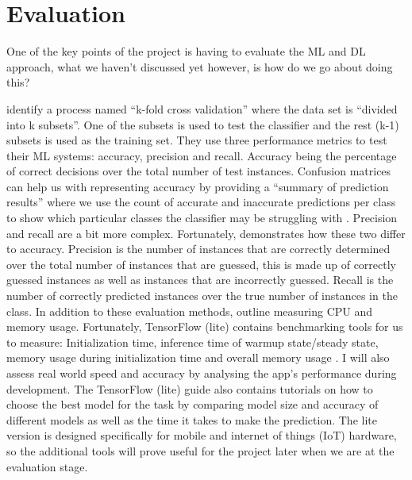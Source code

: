 \documentclass[12pt,a4paper]{report}
\begin{document}
\section{Evaluation}
\label{subsec:evaluation}

One of the key points of the project is having to evaluate the ML and DL approach, what we haven't discussed 
yet however, is how do we go about doing this?

\par

\citet{10.1145/1163593.1163596} identify a process named “k-fold cross validation” where the data set is 
“divided into k subsets”. One of the subsets is used to test the classifier and the rest (k-1) subsets is used as the 
training set. They use three performance metrics to test their ML systems: accuracy, precision and recall. Accuracy 
being the percentage of correct decisions over the total number of test instances. Confusion matrices can help us with 
representing accuracy by providing a “summary of prediction results” where we use the count of accurate and inaccurate 
predictions per class to show which particular classes the classifier may be struggling with \citep{Brownlee2020b}. 
Precision and recall are a bit more complex. 
Fortunately, \citet{shung2018} demonstrates how these two differ to accuracy. Precision is the number of 
instances that are correctly determined over the total number of instances that are guessed, this is made up of 
correctly guessed instances as well as instances that are incorrectly guessed. Recall is the number of correctly 
predicted instances over the true number of instances in the class. In addition to these evaluation methods, 
\citet{10.1145/1163593.1163596} outline measuring CPU and memory usage. Fortunately, TensorFlow (lite) 
contains benchmarking tools for us to measure: Initialization time, inference time of warmup state/steady state, memory 
usage during initialization time and overall memory usage \citep{googleTF}. I will also assess real world speed and 
accuracy by analysing the app's performance during development. The TensorFlow (lite) guide also contains tutorials on 
how to choose the best model for the task by comparing model size and accuracy of different models as well as the time 
it takes to make the prediction. The lite version is designed specifically for mobile and internet of things (IoT) 
hardware, so the additional tools will prove useful for the project later when we are at the evaluation stage.

\par
\end{document}
